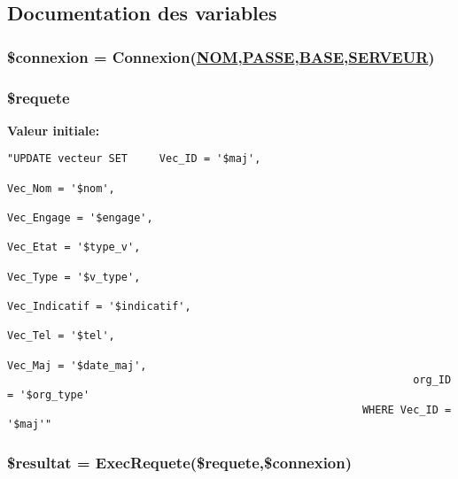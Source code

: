 \subsection{Documentation des variables}
\hypertarget{vecteur__enregistre2_8php_a0}{
\subsubsection[\$connexion]{\setlength{\rightskip}{0pt plus 5cm}\$connexion = Connexion(\hyperlink{pma__connect_8php_a0}{NOM},\hyperlink{pma__connect_8php_a1}{PASSE},\hyperlink{pma__connect_8php_a3}{BASE},\hyperlink{pma__connect_8php_a2}{SERVEUR})}}
\label{vecteur__enregistre2_8php_a0}


\hypertarget{vecteur__enregistre2_8php_a2}{
\subsubsection[\$requete]{\setlength{\rightskip}{0pt plus 5cm}\$requete}}
\label{vecteur__enregistre2_8php_a2}


{\bf Valeur initiale:}

\footnotesize\begin{verbatim}"UPDATE vecteur SET     Vec_ID = '$maj',
                                                                Vec_Nom = '$nom',
                                                                Vec_Engage = '$engage',
                                                                Vec_Etat = '$type_v',
                                                                Vec_Type = '$v_type',
                                                                Vec_Indicatif = '$indicatif',
                                                                Vec_Tel = '$tel',
                                                                Vec_Maj = '$date_maj',
                                                                org_ID = '$org_type'
                                                        WHERE Vec_ID = '$maj'"
\end{verbatim}\normalsize 
\hypertarget{vecteur__enregistre2_8php_a3}{
\subsubsection[\$resultat]{\setlength{\rightskip}{0pt plus 5cm}\$resultat = Exec\-Requete(\$requete,\$connexion)}}
\label{vecteur__enregistre2_8php_a3}


